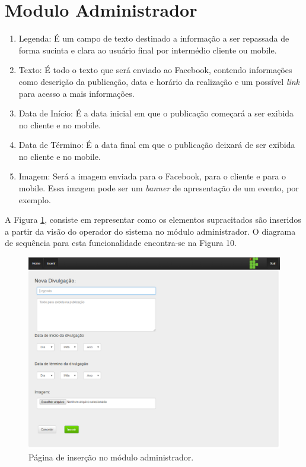 \section{Modulo Administrador}
 \begin{enumerate}
   \item Legenda: É um campo de texto destinado a informação a ser repassada de forma sucinta e clara ao usuário final por intermédio cliente ou mobile. 
   \item Texto: É todo o texto que será enviado ao Facebook, contendo informações como descrição da publicação, data e horário da realização e um possível \textit{link} para acesso a mais informações. 
   \item Data de Início: É a data inicial em que o publicação começará a ser exibida no cliente e no mobile.
   \item Data de Término: É a data final em que o publicação deixará de ser exibida no cliente e no mobile.
   \item Imagem: Será a imagem enviada para o Facebook, para o cliente e para o mobile. Essa imagem pode ser um \textit{banner} de apresentação de um evento, por exemplo.
 \end{enumerate}
 

 A Figura \ref{fig:administrador1}, consiste em representar como os elementos supracitados são inseridos a partir da visão do operador do sistema no módulo administrador. O diagrama de sequência para esta funcionalidade encontra-se na Figura 10.

 
 \begin{figure}[H]
\centering
\includegraphics[scale=0.6]{figuras/administrador1}
\caption{Página de inserção no módulo administrador.}
\label{fig:administrador1}
\end{figure}

